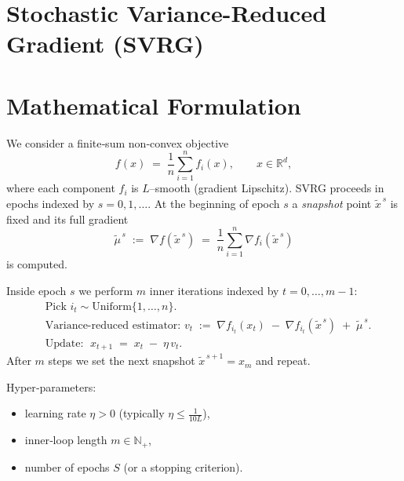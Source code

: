 \documentclass[11pt]{article}
\newcommand{\R}{\mathbb{R}}
\begin{document}
\section*{Stochastic Variance-Reduced Gradient (SVRG)}

\section*{Mathematical Formulation}
We consider a finite‑sum non‑convex objective
\[
f(x)\;=\;\frac{1}{n}\sum_{i=1}^{n} f_i(x),\qquad
x\in\R^{d},
\]
where each component $f_i$ is $L$–smooth (gradient Lipschitz).  
SVRG proceeds in epochs indexed by $s=0,1,\dots$.  
At the beginning of epoch $s$ a \emph{snapshot} point $\tilde{x}^{\,s}$ is fixed and its full gradient
\[
\tilde{\mu}^{\,s}\;:=\;\nabla f(\tilde{x}^{\,s}) \;=\; \frac{1}{n}\sum_{i=1}^{n}\nabla f_i(\tilde{x}^{\,s})
\]
is computed.  

Inside epoch $s$ we perform $m$ inner iterations indexed by $t=0,\dots,m-1$:
\[
\begin{aligned}
&\text{Pick } i_t\sim\text{Uniform}\{1,\dots,n\}.\\
&\text{Variance‑reduced estimator: }
v_t \;:=\; \nabla f_{i_t}(x_t) \;-\; \nabla f_{i_t}(\tilde{x}^{\,s}) \;+\; \tilde{\mu}^{\,s}.\\
&\text{Update: }\;
x_{t+1}\;=\;x_t \;-\; \eta\, v_t .
\end{aligned}
\]
After $m$ steps we set the next snapshot $\tilde{x}^{\,s+1}=x_m$ and repeat.

Hyper‑parameters:
\begin{itemize}
  \item learning rate $\eta>0$ (typically $\eta\le \frac{1}{10L}$),
  \item inner‑loop length $m\in\mathbb{N}_{+}$,
  \item number of epochs $S$ (or a stopping criterion).
\end{itemize}
\end{document}
